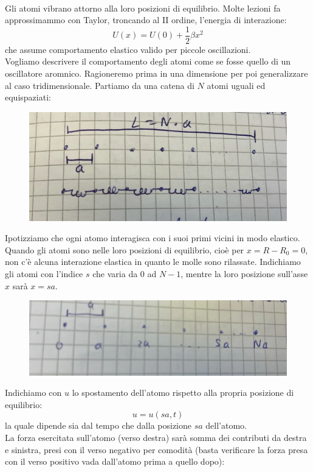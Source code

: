 \documentclass{book}
\begin{document}
        \paragraph{}
        Gli atomi vibrano attorno alla loro posizioni di equilibrio. Molte lezioni fa approssimammo con Taylor, troncando al II ordine, l'energia di interazione:
        $$U(x) = U(0)+\frac{1}{2}\beta x^{2}$$
        che assume comportamento elastico valido per piccole oscillazioni.\\
        Vogliamo descrivere il comportamento degli atomi come se fosse quello di un oscillatore aromnico. Ragioneremo prima in una dimensione per poi generalizzare al caso tridimensionale. Partiamo da una catena di $N$ atomi uguali ed equispaziati:
        \begin{figure}[h!]
            \centering
            \includegraphics[width=0.5\linewidth]{img/imnothere.png}
        \end{figure}
        Ipotizziamo che ogni atomo interagisca con i suoi primi vicini in modo elastico. Quando gli atomi sono nelle loro posizioni di equilibrio, cioè per $x=R-R_{0} = 0$, non c'è alcuna interazione elastica in quanto le molle sono rilassate. Indichiamo gli atomi con l'indice $s$ che varia da $0$ ad $N-1$, mentre la loro posizione sull'asse $x$ sarà $x=sa$.
        \begin{figure}[h!]
            \centering
            \includegraphics[width=0.5\linewidth]{img/imnothere2.png}
        \end{figure}
        Indichiamo con $u$ lo spostamento dell'atomo rispetto alla propria posizione di equilibrio:
        $$u = u(sa, t)$$
        la quale dipende sia dal tempo che dalla posizione $sa$ dell'atomo.\\
        La forza esercitata sull'atomo (verso destra) sarà somma dei contributi da destra e sinistra, presi con il verso negativo per comodità (basta verificare la forza presa con il verso positivo vada dall'atomo prima a quello dopo):
\end{document}
